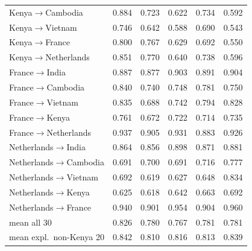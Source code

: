 \documentclass{article}
\begin{document}
\begin{table}[H]
\begin{tabular}{lccccc}
Kenya$\to$Cambodia & 0.884 & 0.723 & 0.622 & 0.734 & 0.592 \\
Kenya$\to$Vietnam & 0.746 & 0.642 & 0.588 & 0.690 & 0.543 \\
Kenya$\to$France & 0.800 & 0.767 & 0.629 & 0.692 & 0.550 \\
Kenya$\to$Netherlands & 0.851 & 0.770 & 0.640 & 0.738 & 0.596 \\
France$\to$India & 0.887 & 0.877 & 0.903 & 0.891 & 0.904 \\
France$\to$Cambodia & 0.840 & 0.740 & 0.748 & 0.781 & 0.750 \\
France$\to$Vietnam & 0.835 & 0.688 & 0.742 & 0.794 & 0.828 \\
France$\to$Kenya & 0.761 & 0.672 & 0.722 & 0.714 & 0.735 \\
France$\to$Netherlands & 0.937 & 0.905 & 0.931 & 0.883 & 0.926 \\
Netherlands$\to$India & 0.864 & 0.856 & 0.898 & 0.871 & 0.881 \\
Netherlands$\to$Cambodia & 0.691 & 0.700 & 0.691 & 0.716 & 0.777 \\
Netherlands$\to$Vietnam & 0.692 & 0.619 & 0.627 & 0.648 & 0.834 \\
Netherlands$\to$Kenya & 0.625 & 0.618 & 0.642 & 0.663 & 0.692 \\
Netherlands$\to$France & 0.940 & 0.901 & 0.954 & 0.904 & 0.960 \\
\midrule
mean all 30 & 0.826 & 0.780 & 0.767 & 0.781 & 0.781 \\
mean expl.\ non-Kenya 20 & 0.842 & 0.810 & 0.816 & 0.813 & 0.839 \\
\bottomrule
\end{tabular}
\end{table}
\end{document}
